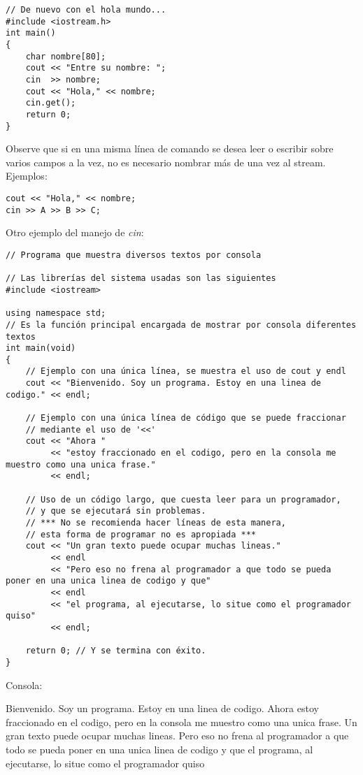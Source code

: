 \begin{lstlisting}[style=Cpp, label=operdirec, caption=Oper Direc]
// De nuevo con el hola mundo...
#include <iostream.h>
int main()
{
    char nombre[80];
    cout << "Entre su nombre: ";
    cin  >> nombre;
    cout << "Hola," << nombre;
    cin.get();
    return 0;
}
\end{lstlisting}

Observe que si en una misma línea de comando se desea leer o escribir sobre varios campos a la vez, no es necesario nombrar más de una vez al stream. Ejemplos:

\begin{lstlisting}[style=Cpp, label=ejemplo-ioc, caption=Ejemplo Cin Cout]
cout << "Hola," << nombre;
cin >> A >> B >> C;
\end{lstlisting}

Otro ejemplo del manejo de \textit{cin}:

\begin{lstlisting}[style=Cpp, label=impresión, caption=Impresión]
// Programa que muestra diversos textos por consola

// Las librerías del sistema usadas son las siguientes
#include <iostream>

using namespace std;
// Es la función principal encargada de mostrar por consola diferentes textos
int main(void)
{
    // Ejemplo con una única línea, se muestra el uso de cout y endl
    cout << "Bienvenido. Soy un programa. Estoy en una linea de codigo." << endl;

    // Ejemplo con una única línea de código que se puede fraccionar
    // mediante el uso de '<<'
    cout << "Ahora "
         << "estoy fraccionado en el codigo, pero en la consola me muestro como una unica frase."
         << endl;

    // Uso de un código largo, que cuesta leer para un programador,
    // y que se ejecutará sin problemas.
    // *** No se recomienda hacer líneas de esta manera,
    // esta forma de programar no es apropiada ***
    cout << "Un gran texto puede ocupar muchas lineas."
         << endl
         << "Pero eso no frena al programador a que todo se pueda poner en una unica linea de codigo y que"
         << endl
         << "el programa, al ejecutarse, lo situe como el programador quiso"
         << endl;

    return 0; // Y se termina con éxito.
}
\end{lstlisting}

Consola:

\begin{listing}[style=consola, numbers=none,label=resultado-impresión,caption=Resultado Impresión]
Bienvenido. Soy un programa. Estoy en una linea de codigo.
Ahora estoy fraccionado en el codigo, pero en la consola me muestro como una unica frase.
Un gran texto puede ocupar muchas lineas.
Pero eso no frena al programador a que todo se pueda poner en una unica linea de codigo y que
el programa, al ejecutarse, lo situe como el programador quiso

\end{listing}



